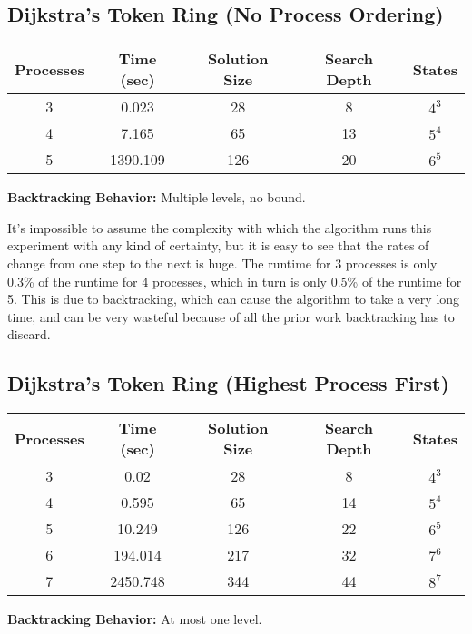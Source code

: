 \subsection{Dijkstra's Token Ring (No Process Ordering)}
\begin{center}
\begin{tabular}{|c|c|c|c|c|}
\hline
 Processes & Time (sec) & Solution Size & Search Depth & States \\
\hline
 3 & 0.023 & 28 & 8 & $4^{3}$         \\
 4 & 7.165 & 65 & 13 & $5^{4}$          \\
 5 & 1390.109 & 126 & 20 & $6^{5}$    \\
\hline
\end{tabular}
\end{center}

{\bf Backtracking Behavior:} Multiple levels, no bound.

It's impossible to assume the complexity with which the algorithm runs this experiment with any kind of certainty, but it is easy to see that the rates of change from one step to the next is huge.
The runtime for 3 processes is only 0.3\% of the runtime for 4 processes, which in turn is only 0.5\% of the runtime for 5.
This is due to backtracking, which can cause the algorithm to take a very long time, and can be very wasteful because of all the prior work backtracking has to discard.

\newpage

\subsection{Dijkstra's Token Ring (Highest Process First)}
\begin{center}
\begin{tabular}{|c|c|c|c|c|}
\hline
 Processes & Time (sec) & Solution Size & Search Depth & States \\
\hline
 3 & 0.02 & 28 & 8 & $4^{3}$         \\
 4 & 0.595 & 65 & 14 & $5^{4}$          \\
 5 & 10.249 & 126 & 22 & $6^{5}$        \\
 6 & 194.014 & 217 & 32 & $7^{6}$      \\
 7 & 2450.748 & 344 & 44 & $8^{7}$    \\
\hline
\end{tabular}
\end{center}

{\bf Backtracking Behavior:} At most one level.

